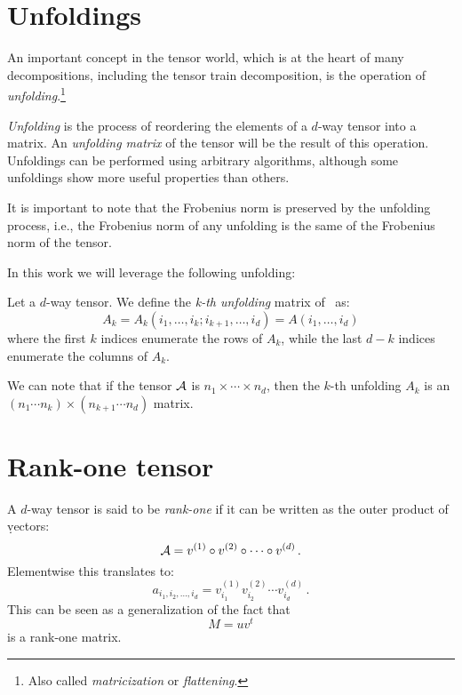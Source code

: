 
\section{Unfoldings}
An important concept in the tensor world, which is at the heart of many decompositions, including the tensor train decomposition, is the operation of \emph{unfolding}.\footnote{Also called \emph{matricization} or \emph{flattening}.}

\emph{Unfolding} is the process of reordering the elements of a $d$-way tensor into a matrix. An \emph{unfolding matrix} of the tensor will be the result of this operation. Unfoldings can be performed using arbitrary algorithms, although some unfoldings show more useful properties than others.

It is important to note that the Frobenius norm is preserved by the unfolding process, i.e., the Frobenius norm of any unfolding is the same of the Frobenius norm of the tensor.

In this work we will leverage the following unfolding:

\begin{Def}
  Let \A a $d$-way tensor. We define the \emph{k-th unfolding} matrix of \A~as:
  \begin{equation} \label{def:unfolding}
    A_k = A_k(i_1,\dots,i_k;i_{k+1},\dots,i_d) = A(i_1,\dots,i_d)
  \end{equation}
where the first $k$ indices enumerate the rows of $A_k$, while the last $d - k$ indices enumerate the columns of $A_k$.
\end{Def}

We can note that if the tensor $\mathcal{A}$ is $n_1 \times \cdots \times n_d$, then the $k$-th unfolding $A_k$ is an $(n_1 \cdots n_k) \times (n_{k+1} \cdots n_d) $ matrix.

\section{Rank-one tensor}
A $d$-way tensor \A is said to be \emph{rank-one} if it can be written as the outer product of \d vectors:
\begin{equation*}
  \mathcal{A} = v^{(1)} \circ v^{(2)} \circ \cdots \circ v^{(d)}\, .
\end{equation*}
Elementwise this translates to:
\begin{equation*}
  a_{i_1,i_2,\ldots,i_d} = v_{i_1}^{(1)} v_{i_2}^{(2)} \cdots v_{i_d}^{(d)}\, .
\end{equation*}
This can be seen as a generalization of the fact that
\begin{equation*}
  M = u v^t
\end{equation*}
is a rank-one matrix.

